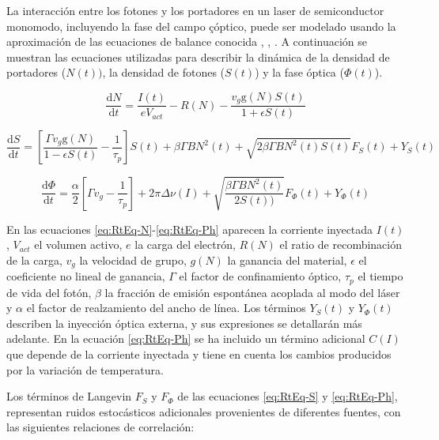 La interacción entre los fotones y los portadores en un laser de semiconductor monomodo, incluyendo la fase del campo çóptico, puede ser modelado usando la aproximación de las ecuaciones de balance conocida \cite{artSim}, \cite{schunk1986noise}, \cite{fatadin2006numerical}. A continuación se muestran las ecuaciones utilizadas para describir la dinámica de la densidad de portadores ($N(t))$,  la densidad de fotones ($S(t)$) y la fase óptica ($\Phi(t)$).

	\begin{equation}
		\frac{\mathrm{d} N}{\mathrm{d} t} = \frac{I(t)}{e V_{act}} - R(N) - \frac{v_g \textrm{g}(N)S(t)}{1 + \epsilon S(t)} 
		\label{eq:RtEq-N}
	\end{equation}

	\begin{equation}
		\frac{\mathrm{d} S}{\mathrm{d} t} = \left[ \frac{\Gamma v_g \textrm{g}(N)}{1 - \epsilon S(t)} - \frac{1}{\tau_p} \right] S(t) + \beta \Gamma BN^2 (t) + \sqrt{2 \beta \Gamma B N^2(t)S(t)} F_S(t) + Y_S(t)
		\label{eq:RtEq-S}
	\end{equation}

	\begin{equation}
		\frac{\mathrm{d} \Phi}{\mathrm{d} t} = \frac{\alpha}{2}\left[ \Gamma v_g  - \frac{1}{\tau_p} \right] + 2\pi\Delta\nu(I) + \sqrt{\frac{\beta \Gamma B N^2(t)}{2 S(t))}} F_{\Phi} (t) + Y_{\Phi}(t)
		\label{eq:RtEq-Ph}
	\end{equation}

	En las ecuaciones \ref{eq:RtEq-N}-\ref{eq:RtEq-Ph} aparecen la corriente inyectada $I(t)$, $V_{act}$ el volumen activo, $e$ la carga del electrón, $R(N)$ el ratio de recombinación de la carga, $v_g$ la velocidad de grupo, $g(N)$ la ganancia del material, $\epsilon$ el coeficiente no lineal de ganancia, $\Gamma$ el factor de confinamiento óptico, $\tau_p$ el tiempo de vida del fotón, $\beta$ la fracción de emisión espontánea acoplada al modo del láser y $\alpha$ el factor de realzamiento del ancho de línea. Los términos $Y_S(t)$ y $Y_{\Phi}(t)$ describen la inyección óptica externa, y sus expresiones se detallarán más adelante. En la ecuación \ref{eq:RtEq-Ph} se ha incluido un término adicional $C(I)$ que depende de la corriente inyectada y tiene en cuenta los cambios producidos por la variación de temperatura.

Los términos de Langevin $F_S$ y $F_{\Phi}$ de las ecuaciones \ref{eq:RtEq-S} y \ref{eq:RtEq-Ph}, representan ruidos estocásticos adicionales provenientes de diferentes fuentes, con las siguientes relaciones de correlación:

